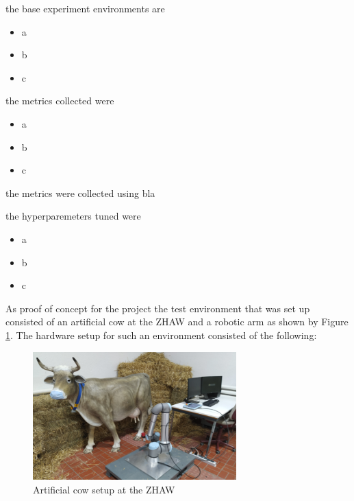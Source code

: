 the base experiment environments are
\begin{itemize}
    \item a
    \item b
    \item c
\end{itemize}

the metrics collected were
\begin{itemize}
    \item a
    \item b
    \item c
\end{itemize}

the metrics were collected using bla

the hyperparemeters tuned were
\begin{itemize}
    \item a
    \item b
    \item c
\end{itemize}



    As proof of concept for the project the test environment that was set up consisted of an artificial cow at the ZHAW and a robotic arm as shown by Figure \ref{fig:cow_setup}. The hardware setup for such an environment consisted of the following:
     \begin{figure}[h]
        \centering
        \includegraphics[width=0.7\textwidth]{images/cow_setup.png}
        \caption{Artificial cow setup at the ZHAW}
        \label{fig:cow_setup}
    \end{figure}
    
